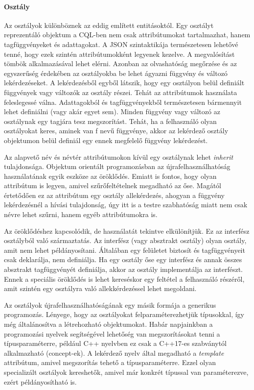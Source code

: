 \documentclass[a4paper,12pt]{report}
\begin{document}
\paragraph{Osztály}
Az osztályok különböznek az eddig említett entitásoktól. Egy osztályt reprezentáló objektum a CQL-ben nem csak attribútumokat tartalmazhat, hanem tagfüggvényeket és adattagokat. A JSON szintaktikája természetesen lehetővé tenné, hogy ezek szintén attribútumokként legyenek kezelve. A megvalósítást tömbök alkalmazásával lehet elérni. Azonban az olvashatóság megőrzése és az egyszerűség érdekében az osztályokba be lehet ágyazni függvény és változó lekérdezéseket. A lekérdezésből egyből látszik, hogy egy osztályon belül definiált függvények vagy változók az osztály részei. Tehát az attribútumok használata feleslegessé válna. Adattagokból és tagfüggvényekből természetesen bármennyit lehet definiálni (vagy akár egyet sem). Minden függvény vagy változó az osztálynak egy tagjára tesz megszorítást. Tehát, ha a felhasználó olyan osztályokat keres, aminek van f nevű függvénye, akkor az lekérdező osztály objektumon belül definiál egy ennek megfelelő függvény lekérdezést.
\par Az alapvető név és névtér attribútumokon kívül egy osztálynak lehet \textit{inherit} tulajdonsága. Objektum orientált programozásban az újrafelhasználhatóság használatának egyik eszköze az öröklődés. Emiatt is fontos, hogy olyan attribútum is legyen, amivel szűrőfeltételnek megadható az őse. Magától értetődően ez az attribútum egy osztály allekérdezés, ahogyan a függvény lekérdezésnél a hívási tulajdonság, úgy itt is a testre szabhatóság miatt nem csak névre lehet szűrni, hanem egyéb attribútumokra is.
\par Az öröklődéshez kapcsolódik, de használatát tekintve elkülönítjük. Ez az interfész osztályból való származtatás. Az interfész (vagy absztrakt osztály) olyan osztály, amit nem lehet példányosítani. Általában egy felületet biztosít és tagfüggvényeit csak deklarálja, nem definiálja. Ha egy osztály őse egy interfész és annak összes absztrakt tagfüggvényét definiálja, akkor az osztály implementálja az interfészt. Ennek a speciális öröklődés is lehet kereséskor egy feltétel a felhasználó részéről, amit szintén egy osztályra való allekkérdezéssel lehet megoldani.
\par Az osztályok újrafelhasználhatóságának egy másik formája a generikus programozás. Lényege, hogy az osztályokat felparaméterezhetjük típusokkal, így még általánosítva a létrehozható objektumokat. Habár napjainkban a programozási nyelvek segítségével lehetőség van megszorításokat tenni a típusparaméterre, például C++ nyelvben ez csak a C++17-es szabványtól alkalmazható (concept-ek). A lekérdező nyelv által megadható a \textit{template} attribútum, amivel megszorítás tehető a típusparaméterre. Ezzel olyan specializált osztályok kereshetők, amivel már konkrét típussal van paraméterezve, ezért példányosítható is.
\end{document}
